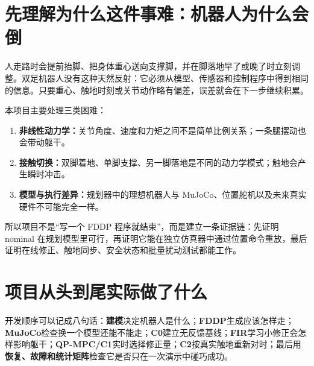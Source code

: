 \documentclass[UTF8,11pt,a4paper]{ctexart}
\begin{document}
\section{先理解为什么这件事难：机器人为什么会倒}\label{sec:why_hard}

\begin{intuitionbox}
人走路时会提前抬脚、把身体重心送向支撑脚，并在脚落地早了或晚了时立刻调整。双足机器人没有这种天然反射：它必须从模型、传感器和控制程序中得到相同的信息。只要重心、触地时刻或关节动作略有偏差，误差就会在下一步继续积累。
\end{intuitionbox}

本项目主要处理三类困难：

\begin{enumerate}
  \item \textbf{非线性动力学：}关节角度、速度和力矩之间不是简单比例关系；一条腿摆动也会带动躯干。
  \item \textbf{接触切换：}双脚着地、单脚支撑、另一脚落地是不同的动力学模式；触地会产生瞬时冲击。
  \item \textbf{模型与执行差异：}规划器中的理想机器人与 MuJoCo、位置舵机以及未来真实硬件不可能完全一样。
\end{enumerate}

所以项目不是“写一个 FDDP 程序就结束”，而是建立一条证据链：先证明 nominal 在规划模型里可行，再证明它能在独立仿真器中通过位置命令重放，最后证明在线修正、触地同步、安全状态和批量扰动测试都能工作。

\section{项目从头到尾实际做了什么}\label{sec:story}

\begin{projectbox}
开发顺序可以记成八句话：\textbf{建模}决定机器人是什么；\textbf{FDDP}生成应该怎样走；\textbf{MuJoCo}检查换一个模型还能不能走；\textbf{C0}建立无反馈基线；\textbf{FIR}学习小修正会怎样影响躯干；\textbf{QP-MPC/C1}实时选择修正量；\textbf{C2}按真实触地重新对时；最后用\textbf{恢复、故障和统计矩阵}检查它是否只在一次演示中碰巧成功。
\end{projectbox}
\end{document}
